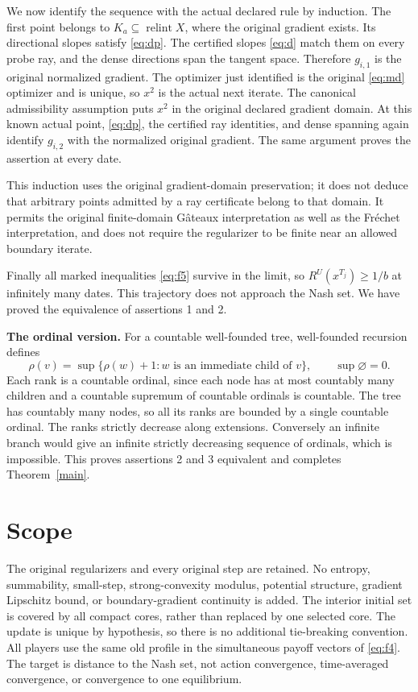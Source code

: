 \documentclass[11pt,a4paper]{article}
\newcommand{\ri}{\operatorname{relint}}
\begin{document}
We now identify the sequence with the actual declared rule by induction.
The first point belongs to \(K_a\subseteq\ri X\), where the original gradient
exists. Its directional slopes satisfy \eqref{eq:dp}. The certified slopes \eqref{eq:d} match
them on every probe ray, and the dense directions span the tangent space.
Therefore \(g_{i,1}\) is the original normalized gradient. The optimizer
just identified is the original \eqref{eq:md} optimizer and is unique, so \(x^2\)
is the actual next iterate. The canonical admissibility assumption puts
\(x^2\) in the original declared gradient domain. At this known actual point,
\eqref{eq:dp}, the certified ray identities, and dense spanning again identify
\(g_{i,2}\) with the normalized original gradient. The same argument proves
the assertion at every date.

This induction uses the original gradient-domain preservation; it does not
deduce that arbitrary points admitted by a ray certificate belong to that
domain. It permits the original finite-domain G\^ateaux interpretation as well
as the Fr\'echet interpretation, and does not require the regularizer to be
finite near an allowed boundary iterate.

Finally all marked inequalities \eqref{eq:f5} survive in the limit, so
\(R^U(x^{T_j})\ge1/b\) at infinitely many dates. This trajectory does not
approach the Nash set. We have proved the equivalence of assertions 1 and 2.

\textbf{The ordinal version.}
For a countable well-founded tree, well-founded recursion defines
\[
\rho(v)=\sup\{\rho(w)+1:w\text{ is an immediate child of }v\},
\qquad \sup\varnothing=0.
\]
Each rank is a countable ordinal, since each node has at most countably many
children and a countable supremum of countable ordinals is countable.
The tree has countably many nodes, so all its ranks are bounded by a single
countable ordinal. The ranks strictly decrease along extensions. Conversely
an infinite branch would give an infinite strictly decreasing sequence of
ordinals, which is impossible. This proves assertions 2 and 3 equivalent and
completes Theorem~\ref{main}.

\section{Scope}

The original regularizers and every original step are retained. No entropy,
summability, small-step, strong-convexity modulus, potential structure, gradient
Lipschitz bound, or boundary-gradient continuity is added. The interior initial
set is covered by all compact cores, rather than replaced by one selected core.
The update is unique by hypothesis, so there is no additional tie-breaking
convention. All players use the same old profile in the simultaneous payoff
vectors of \eqref{eq:f4}. The target is distance to the Nash set, not action convergence,
time-averaged convergence, or convergence to one equilibrium.
\end{document}

